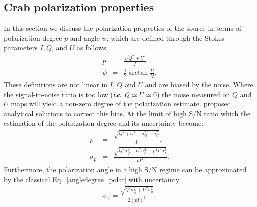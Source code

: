 \documentclass[twocolumn,traditabstract]{aa}
\begin{document}



\subsection{Crab polarization properties}\label{sec:pol_properties}
In this section we discuss the polarization properties of the source in terms of polarization degree $p$ and angle $\psi$, which are defined through the Stokes parameters $I, Q$, and $U$ as follows:
\begin{eqnarray}
 p    &=& \frac{\sqrt{Q^2 + U^2}}{I} \nonumber \\
 \psi &=& \frac{1}{2}\arctan\frac{U}{Q}.\label{angledegree_polar}
 \end{eqnarray}
 These definitions are not linear in $I$, $Q$ and $U$ and are biased by the noise. Where the signal-to-noise ratio is too low ($\it{i.e.}$ $ Q \simeq U \simeq 0$)  the noise measured on $Q$ and $U$ maps will yield a non-zero degree of the polarization estimate.
\citet{1980A&A....91...97S,1985A&A...142..100S,montier} proposed analytical solutions to correct this bias. At the limit of high S/N ratio which the estimation of the polarization degree and its uncertainty become:
 \begin{eqnarray}
 p    &=& \frac{\sqrt{Q^2 + U^2 - \sigma_{Q}^2 - \sigma_{U}^2}}{I}, \nonumber \\ 
  \sigma_{p} &=& \frac{\sqrt{Q^2\sigma_Q^2 + U^2\sigma_U^2 + p^4I^2\sigma_I^2}}{pI^2}.
  \label{p_true_degree}
 \end{eqnarray}
 Furthermore, the polarization angle in a high S/N regime can be approximated by the classical Eq.~\ref{angledegree_polar} with uncertainty
  \begin{eqnarray}\label{angle_uncertainty}
  \sigma_{\psi} = \frac{\sqrt{Q^2\sigma_Q^2 + U^2\sigma_u^2}}{2(pI)^2}.
  \end{eqnarray}
\end{document}
